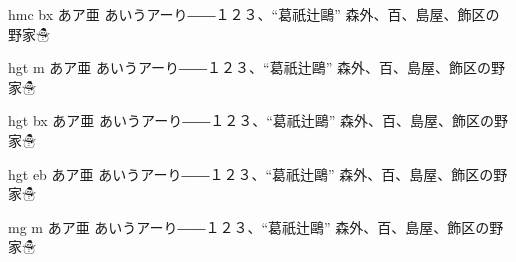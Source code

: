 \documentclass[dvipdfmx,uplatex]{utarticle}
\begin{document}
\selectfont hmc bx あア亜
あいうアーり――１２３、“葛祇辻鷗” 森外、百、島屋、飾区の野家☃


\selectfont hgt m あア亜
あいうアーり――１２３、“葛祇辻鷗” 森外、百、島屋、飾区の野家☃

\selectfont hgt bx あア亜
あいうアーり――１２３、“葛祇辻鷗” 森外、百、島屋、飾区の野家☃

\selectfont hgt eb あア亜
あいうアーり――１２３、“葛祇辻鷗” 森外、百、島屋、飾区の野家☃


\selectfont mg m あア亜
あいうアーり――１２３、“葛祇辻鷗” 森外、百、島屋、飾区の野家☃
\end{document}
